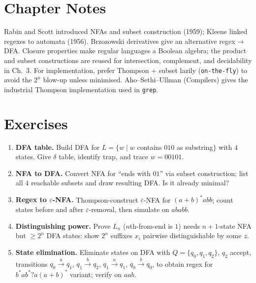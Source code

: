 \section{Chapter Notes}
Rabin and Scott introduced NFAs and subset construction (1959); Kleene linked regexes to automata (1956). Brzozowski derivatives give an alternative regex$\to$DFA.
Closure properties make regular languages a Boolean algebra; the product and subset constructions are reused for intersection, complement, and decidability in Ch.~3.
For implementation, prefer Thompson + subset lazily (\texttt{on-the-fly}) to avoid the $2^n$ blow-up unless minimised.
Aho--Sethi--Ullman (Compilers) gives the industrial Thompson implementation used in \texttt{grep}.

\section{Exercises}
\label{sec:ch02-exercises}
\begin{enumerate}[label=E2.\arabic*, leftmargin=*, itemsep=0.8em]
\item \textbf{DFA table.} Build DFA for $L=\{w\mid w$ contains $010$ as substring$\}$ with $4$ states. Give $\delta$ table, identify trap, and trace $w=00101$.
\item \textbf{NFA to DFA.} Convert NFA for ``ends with $01$'' via subset construction; list all $4$ reachable subsets and draw resulting DFA. Is it already minimal?
\item \textbf{Regex to $\varepsilon$-NFA.} Thompson-construct $\varepsilon$-NFA for $(a+b)^*abb$; count states before and after $\varepsilon$-removal, then simulate on $ababb$.
\item \textbf{Distinguishing power.} Prove $L_n$ ($n$th-from-end is $1$) needs $n+1$-state NFA but $\ge2^n$ DFA states: show $2^n$ suffixes $x_i$ pairwise distinguishable by some $z$.
\item \textbf{State elimination.} Eliminate states on DFA with $Q=\{q_0,q_1,q_2\}$, $q_2$ accept, transitions $q_0\xrightarrow{a}q_1$, $q_1\xrightarrow{b}q_2$, $q_1\xrightarrow{a}q_1$, $q_0\xrightarrow{b}q_0$, to obtain regex for $b^*ab^*?a(a+b)^*$ variant; verify on $aab$.
\end{enumerate}
